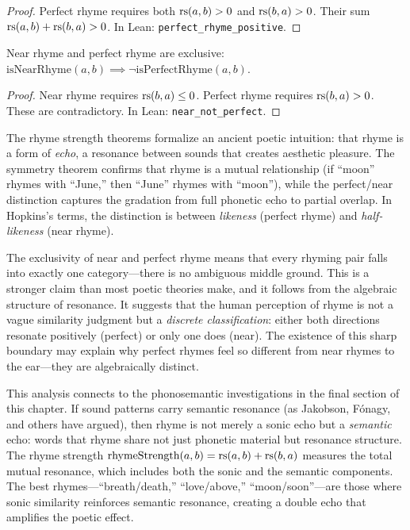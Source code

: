 \begin{proof}
Perfect rhyme requires both $\mathrm{rs}(a, b) > 0$ and $\mathrm{rs}(b, a) > 0$.  Their sum $\mathrm{rs}(a, b) + \mathrm{rs}(b, a) > 0$.  In Lean: \texttt{perfect\_rhyme\_positive}.
\end{proof}

\begin{theorem}
\label{thm:near-not-perfect}
Near rhyme and perfect rhyme are exclusive: $\text{isNearRhyme}(a, b) \implies \neg\text{isPerfectRhyme}(a, b)$.
\end{theorem}

\begin{proof}
Near rhyme requires $\mathrm{rs}(b, a) \leq 0$.  Perfect rhyme requires $\mathrm{rs}(b, a) > 0$.  These are contradictory.  In Lean: \texttt{near\_not\_perfect}.
\end{proof}

\begin{interpretation}
\label{interp:rhyme-phonetics}
The rhyme strength theorems formalize an ancient poetic intuition: that rhyme is a form of \emph{echo}, a resonance between sounds that creates aesthetic pleasure.  The symmetry theorem confirms that rhyme is a mutual relationship (if ``moon'' rhymes with ``June,'' then ``June'' rhymes with ``moon''), while the perfect/near distinction captures the gradation from full phonetic echo to partial overlap.  In Hopkins's terms, the distinction is between \emph{likeness} (perfect rhyme) and \emph{half-likeness} (near rhyme).

The exclusivity of near and perfect rhyme means that every rhyming pair falls into exactly one category---there is no ambiguous middle ground.  This is a stronger claim than most poetic theories make, and it follows from the algebraic structure of resonance.  It suggests that the human perception of rhyme is not a vague similarity judgment but a \emph{discrete classification}: either both directions resonate positively (perfect) or only one does (near).  The existence of this sharp boundary may explain why perfect rhymes feel so different from near rhymes to the ear---they are algebraically distinct.

This analysis connects to the phonosemantic investigations in the final section of this chapter.  If sound patterns carry semantic resonance (as Jakobson, Fónagy, and others have argued), then rhyme is not merely a sonic echo but a \emph{semantic} echo: words that rhyme share not just phonetic material but resonance structure.  The rhyme strength $\text{rhymeStrength}(a, b) = \mathrm{rs}(a, b) + \mathrm{rs}(b, a)$ measures the total mutual resonance, which includes both the sonic and the semantic components.  The best rhymes---``breath/death,'' ``love/above,'' ``moon/soon''---are those where sonic similarity reinforces semantic resonance, creating a double echo that amplifies the poetic effect.
\end{interpretation}

